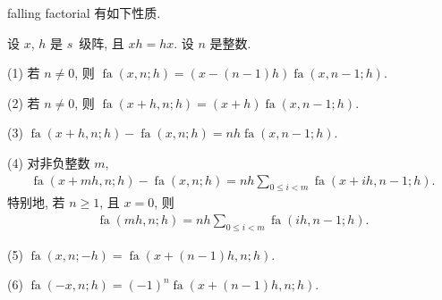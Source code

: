 \documentclass[../libro.tex]{subfiles}
\begin{document}
falling factorial 有如下性质.

\begin{theorem}
    设 \(x\), \(h\) 是 \(s\)~级阵,
    且 \(x h = h x\).
    设 \(n\) 是整数.

    (1)
    若 \(n \neq 0\), 则
    \(\operatorname{fa} {(x, n; h)}
    = (x - (n - 1)h) \operatorname{fa} {(x, n-1; h)}\).

    (2)
    若 \(n \neq 0\), 则
    \(\operatorname{fa} {(x + h, n; h)}
    = (x + h) \operatorname{fa} {(x, n-1; h)}\).

    (3)
    \(\operatorname{fa} {(x + h, n; h)}
        - \operatorname{fa} {(x, n; h)}
    = n h \operatorname{fa} {(x, n-1; h)}\).

    (4)
    对非负整数 \(m\),
    \begin{align*}
        \operatorname{fa} {(x + m h, n; h)}
        - \operatorname{fa} {(x, n; h)}
        = n h \sum_{0 \leq i < m}
        {\operatorname{fa} {(x + i h, n-1; h)}}.
    \end{align*}
    特别地, 若 \(n \geq 1\), 且 \(x = 0\),
    则
    \begin{align*}
        \operatorname{fa} {(m h, n; h)}
        = n h \sum_{0 \leq i < m}
        {\operatorname{fa} {(i h, n-1; h)}}.
    \end{align*}

    (5)
    \(\operatorname{fa} {(x, n; -h)}
    = \operatorname{fa} {(x + (n-1) h, n; h)}\).

    (6)
    \(\operatorname{fa} {(-x, n; h)}
    = (-1)^n \operatorname{fa} {(x + (n-1) h, n; h)}\).
\end{theorem}
\end{document}

